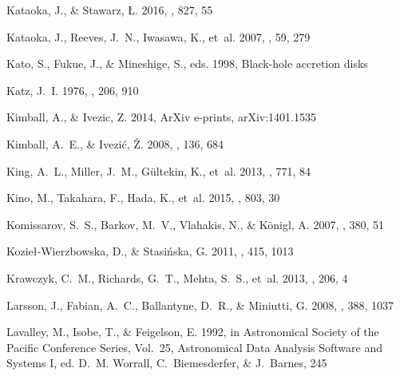 \documentclass[preprint2,twocolappendix]{aastex6}
\begin{document}
\begin{thebibliography}{}
{Kataoka}, J., \& {Stawarz}, {\L}. 2016, \apj, 827, 55

{Kataoka}, J., {Reeves}, J.~N., {Iwasawa}, K., {et~al.} 2007, \pasj, 59, 279

{Kato}, S., {Fukue}, J., \& {Mineshige}, S., eds. 1998, {Black-hole accretion
  disks}

{Katz}, J.~I. 1976, \apj, 206, 910

{Kimball}, A., \& {Ivezic}, Z. 2014, ArXiv e-prints, arXiv:1401.1535

{Kimball}, A.~E., \& {Ivezi{\'c}}, {\v Z}. 2008, \aj, 136, 684

{King}, A.~L., {Miller}, J.~M., {G{\"u}ltekin}, K., {et~al.} 2013, \apj, 771,
  84

{Kino}, M., {Takahara}, F., {Hada}, K., {et~al.} 2015, \apj, 803, 30

{Komissarov}, S.~S., {Barkov}, M.~V., {Vlahakis}, N., \& {K{\"o}nigl}, A. 2007,
  \mnras, 380, 51

{Kozie{\l}-Wierzbowska}, D., \& {Stasi{\'n}ska}, G. 2011, \mnras, 415, 1013

{Krawczyk}, C.~M., {Richards}, G.~T., {Mehta}, S.~S., {et~al.} 2013, \apjs,
  206, 4

{Larsson}, J., {Fabian}, A.~C., {Ballantyne}, D.~R., \& {Miniutti}, G. 2008,
  \mnras, 388, 1037

{Lavalley}, M., {Isobe}, T., \& {Feigelson}, E. 1992, in Astronomical Society
  of the Pacific Conference Series, Vol.~25, Astronomical Data Analysis
  Software and Systems I, ed. D.~M. {Worrall}, C.~{Biemesderfer}, \&
  J.~{Barnes}, 245


\end{thebibliography}
\end{document}
